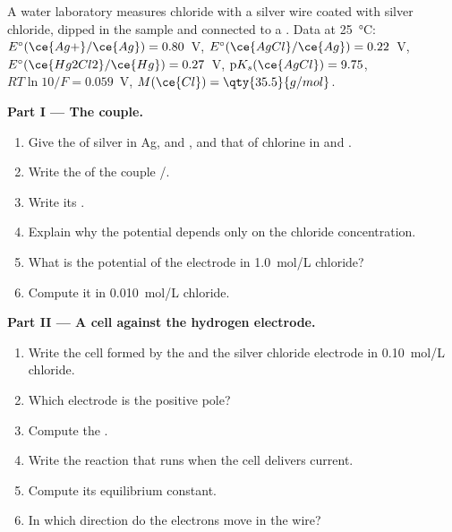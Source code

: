 \begin{problem}
\label{pb:b1:nernst:1}
A water laboratory measures chloride with a silver wire coated with silver
chloride, dipped in the sample and connected to a .
Data at \qty{25}{\celsius}: $E^\circ(\ce{Ag+}/\ce{Ag}) = 0.80$~V,
$E^\circ(\ce{AgCl}/\ce{Ag}) = 0.22$~V, $E^\circ(\ce{Hg2Cl2}/\ce{Hg}) =
0.27$~V, $\mathrm{p}K_s(\ce{AgCl}) = 9.75$, $RT\ln 10/F = 0.059$~V,
$M(\ce{Cl}) = \qty{35.5}{g/mol}$.

\medskip
\noindent\textbf{Part I --- The couple.}
\begin{enumerate}
  \item Give the  of silver in Ag,  and ,
        and that of chlorine in  and .
  \item Write the  of the couple /.
  \item Write its .
  \item Explain why the potential depends only on the chloride
        concentration.
  \item What is the potential of the electrode in \qty{1.0}{mol/L}
        chloride?
  \item Compute it in \qty{0.010}{mol/L} chloride.
\end{enumerate}

\medskip
\noindent\textbf{Part II --- A cell against the hydrogen electrode.}
\begin{enumerate}[resume]
  \item Write the cell formed by the  and the
        silver chloride electrode in \qty{0.10}{mol/L} chloride.
  \item Which electrode is the positive pole?
  \item Compute the .
  \item Write the reaction that runs when the cell delivers current.
  \item Compute its equilibrium constant.
  \item In which direction do the electrons move in the wire?
\end{enumerate}


\end{problem}
